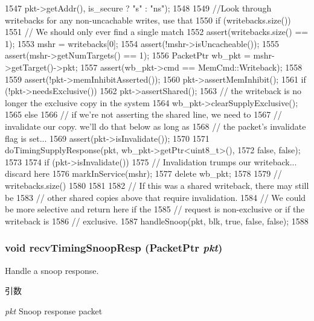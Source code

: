 \begin{DoxyCode}
{{1547                 pkt->getAddr(), is_secure ? "s" : "ns");
1548 
1549         //Look through writebacks for any non-uncachable writes, use that
1550         if (writebacks.size()) {
1551             // We should only ever find a single match
1552             assert(writebacks.size() == 1);
1553             mshr = writebacks[0];
1554             assert(!mshr->isUncacheable());
1555             assert(mshr->getNumTargets() == 1);
1556             PacketPtr wb_pkt = mshr->getTarget()->pkt;
1557             assert(wb_pkt->cmd == MemCmd::Writeback);
1558 
1559             assert(!pkt->memInhibitAsserted());
1560             pkt->assertMemInhibit();
1561             if (!pkt->needsExclusive()) {
1562                 pkt->assertShared();
1563                 // the writeback is no longer the exclusive copy in the system
1564                 wb_pkt->clearSupplyExclusive();
1565             } else {
1566                 // if we're not asserting the shared line, we need to
1567                 // invalidate our copy.  we'll do that below as long as
1568                 // the packet's invalidate flag is set...
1569                 assert(pkt->isInvalidate());
1570             }
1571             doTimingSupplyResponse(pkt, wb_pkt->getPtr<uint8_t>(),
1572                                    false, false);
1573 
1574             if (pkt->isInvalidate()) {
1575                 // Invalidation trumps our writeback... discard here
1576                 markInService(mshr);
1577                 delete wb_pkt;
1578             }
1579         } // writebacks.size()
1580     }
1581 
1582     // If this was a shared writeback, there may still be
1583     // other shared copies above that require invalidation.
1584     // We could be more selective and return here if the
1585     // request is non-exclusive or if the writeback is
1586     // exclusive.
1587     handleSnoop(pkt, blk, true, false, false);
1588 }
\end{DoxyCode}
\hypertarget{classCache_a55143a3333ff75d0df66bd6e4eb50fb7}{
\subsubsection[{recvTimingSnoopResp}]{\setlength{\rightskip}{0pt plus 5cm}void recvTimingSnoopResp ({\bf PacketPtr} {\em pkt})}}
\label{classCache_a55143a3333ff75d0df66bd6e4eb50fb7}
Handle a snoop response. 
\begin{DoxyParams}{引数}
\item[{\em pkt}]Snoop response packet \end{DoxyParams}



